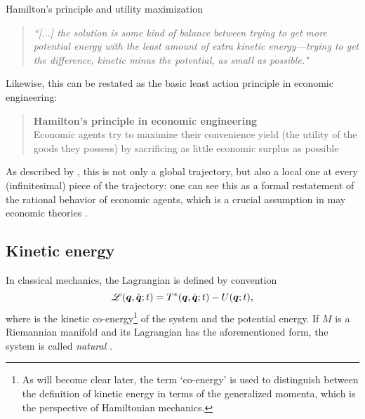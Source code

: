 \begin{econ}{Hamilton's principle and utility maximization}
    \begin{quote}
        \emph{``[...] the solution is some kind of balance between trying to get more potential energy with the least amount of extra kinetic energy—trying to get the difference, kinetic minus the potential, as small as possible."}
    \end{quote}
    Likewise, this can be restated as the basic least action principle in economic engineering:
    \begin{quote}
        \textbf{Hamilton's principle in economic engineering}\\ Economic agents try  to maximize their convenience yield (the utility of the goods they possess) by sacrificing as little  economic surplus as possible
    \end{quote}
    As described by \citet{Feynman2010}, this is not only a global trajectory, but also a local one at every (infinitesimal) piece of the trajectory: one can see this as a formal restatement of the rational behavior of economic agents, which is a crucial assumption in may economic theories \cite{Mankiw2017}.
\end{econ}

\subsection{Kinetic energy}
In classical mechanics, the Lagrangian is defined by convention
\[\mathscr{L}(\vb*{q},\dot{\vb*{q}}; t) = T^*(\vb*{q},\dot{\vb*{q}}; t) - U(\vb*{q}; t),\] 
where \ecokin is the kinetic co-energy\footnote{As will become clear later, the term `co-energy' is used to distinguish between the definition of kinetic energy in terms of the generalized momenta, which is the perspective of Hamiltonian mechanics.} of the system and \epot the potential energy. If \(M\) is a Riemannian manifold and its Lagrangian has the aforementioned form, the system is called \emph{natural} \cite{Arnold1989}.

